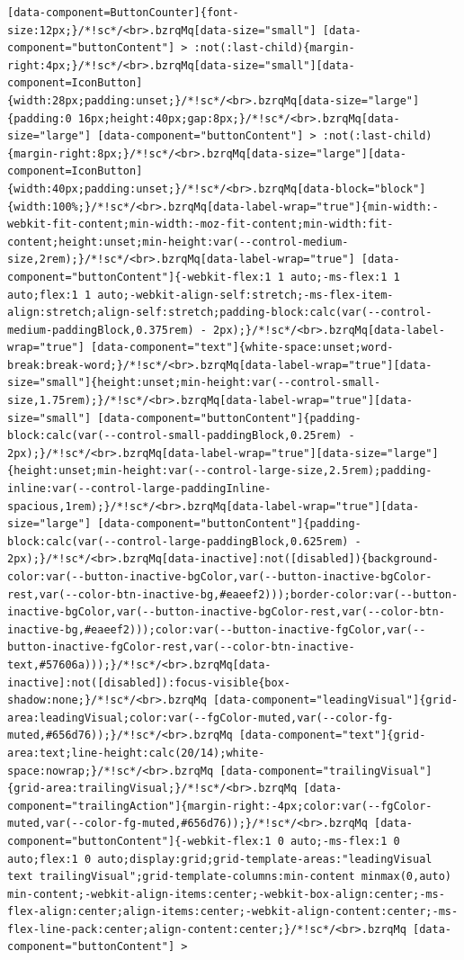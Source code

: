 \documentclass[
  letterpaper,
]{book}
\begin{document}
\begin{verbatim}
[data-component=ButtonCounter]{font-size:12px;}/*!sc*/<br>.bzrqMq[data-size="small"] [data-component="buttonContent"] > :not(:last-child){margin-right:4px;}/*!sc*/<br>.bzrqMq[data-size="small"][data-component=IconButton]{width:28px;padding:unset;}/*!sc*/<br>.bzrqMq[data-size="large"]{padding:0 16px;height:40px;gap:8px;}/*!sc*/<br>.bzrqMq[data-size="large"] [data-component="buttonContent"] > :not(:last-child){margin-right:8px;}/*!sc*/<br>.bzrqMq[data-size="large"][data-component=IconButton]{width:40px;padding:unset;}/*!sc*/<br>.bzrqMq[data-block="block"]{width:100%;}/*!sc*/<br>.bzrqMq[data-label-wrap="true"]{min-width:-webkit-fit-content;min-width:-moz-fit-content;min-width:fit-content;height:unset;min-height:var(--control-medium-size,2rem);}/*!sc*/<br>.bzrqMq[data-label-wrap="true"] [data-component="buttonContent"]{-webkit-flex:1 1 auto;-ms-flex:1 1 auto;flex:1 1 auto;-webkit-align-self:stretch;-ms-flex-item-align:stretch;align-self:stretch;padding-block:calc(var(--control-medium-paddingBlock,0.375rem) - 2px);}/*!sc*/<br>.bzrqMq[data-label-wrap="true"] [data-component="text"]{white-space:unset;word-break:break-word;}/*!sc*/<br>.bzrqMq[data-label-wrap="true"][data-size="small"]{height:unset;min-height:var(--control-small-size,1.75rem);}/*!sc*/<br>.bzrqMq[data-label-wrap="true"][data-size="small"] [data-component="buttonContent"]{padding-block:calc(var(--control-small-paddingBlock,0.25rem) - 2px);}/*!sc*/<br>.bzrqMq[data-label-wrap="true"][data-size="large"]{height:unset;min-height:var(--control-large-size,2.5rem);padding-inline:var(--control-large-paddingInline-spacious,1rem);}/*!sc*/<br>.bzrqMq[data-label-wrap="true"][data-size="large"] [data-component="buttonContent"]{padding-block:calc(var(--control-large-paddingBlock,0.625rem) - 2px);}/*!sc*/<br>.bzrqMq[data-inactive]:not([disabled]){background-color:var(--button-inactive-bgColor,var(--button-inactive-bgColor-rest,var(--color-btn-inactive-bg,#eaeef2)));border-color:var(--button-inactive-bgColor,var(--button-inactive-bgColor-rest,var(--color-btn-inactive-bg,#eaeef2)));color:var(--button-inactive-fgColor,var(--button-inactive-fgColor-rest,var(--color-btn-inactive-text,#57606a)));}/*!sc*/<br>.bzrqMq[data-inactive]:not([disabled]):focus-visible{box-shadow:none;}/*!sc*/<br>.bzrqMq [data-component="leadingVisual"]{grid-area:leadingVisual;color:var(--fgColor-muted,var(--color-fg-muted,#656d76));}/*!sc*/<br>.bzrqMq [data-component="text"]{grid-area:text;line-height:calc(20/14);white-space:nowrap;}/*!sc*/<br>.bzrqMq [data-component="trailingVisual"]{grid-area:trailingVisual;}/*!sc*/<br>.bzrqMq [data-component="trailingAction"]{margin-right:-4px;color:var(--fgColor-muted,var(--color-fg-muted,#656d76));}/*!sc*/<br>.bzrqMq [data-component="buttonContent"]{-webkit-flex:1 0 auto;-ms-flex:1 0 auto;flex:1 0 auto;display:grid;grid-template-areas:"leadingVisual text trailingVisual";grid-template-columns:min-content minmax(0,auto) min-content;-webkit-align-items:center;-webkit-box-align:center;-ms-flex-align:center;align-items:center;-webkit-align-content:center;-ms-flex-line-pack:center;align-content:center;}/*!sc*/<br>.bzrqMq [data-component="buttonContent"] > 
\end{verbatim}
\end{document}
